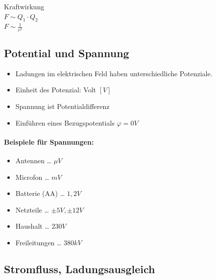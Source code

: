 Kraftwirkung\\
$F \sim Q_1 \cdot Q_2$\\
$F \sim \frac{1}{r^2}$\\

\subsection{Potential und Spannung}

\begin{itemize}
\item Ladungen im elektrischen Feld haben unterschiedliche Potenziale.
\item Einheit des Potenzial: Volt $[V]$
\item Spannung ist Potentialdifferenz
\item Einführen eines Bezugspotentials $\varphi = 0 V$
\end{itemize}

\paragraph{Beispiele für Spannungen:}
\begin{itemize}
\item Antennen … $\mu V$
\item Microfon … $m V $
\item Batterie (AA) … $1,2 V $
\item Netzteile … $\pm 5 V, \pm 12 V$
\item Haushalt … $230V$
\item Freileitungen … $380 kV$
\end{itemize}

\subsection{Stromfluss, Ladungsausgleich}

